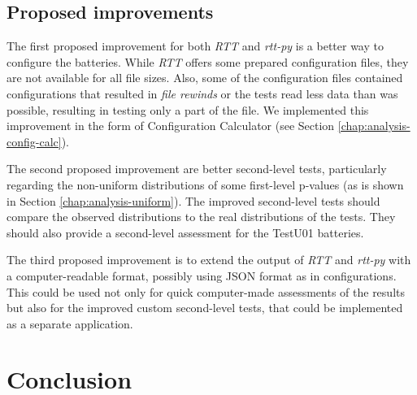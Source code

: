 \documentclass[
  digital,     %
  oneside,     %
  nosansbold,  %
  nocolorbold, %
  nolof,         %
  nolot,         %
]{fithesis4}
\begin{document}
\section{Proposed improvements}
The first proposed improvement for both \emph{RTT} and \emph{rtt-py} is a better way to configure the batteries. While \emph{RTT} offers some prepared configuration files, they are not available for all file sizes. Also, some of the configuration files contained configurations that resulted in \emph{file rewinds} or the tests read less data than was possible, resulting in testing only a part of the file. We implemented this improvement in the form of Configuration Calculator (see Section \ref{chap:analysis-config-calc}).

The second proposed improvement are better second-level tests, particularly regarding the non-uniform distributions of some first-level p-values (as is shown in Section \ref{chap:analysis-uniform}). The improved second-level tests should compare the observed distributions to the real distributions of the tests. They should also provide a second-level assessment for the TestU01 batteries.

The third proposed improvement is to extend the output of \emph{RTT} and \emph{rtt-py} with a computer-readable format, possibly using JSON format as in configurations. This could be used not only for quick computer-made assessments of the results but also for the improved custom second-level tests, that could be implemented as a separate application.


\chapter{Conclusion}


\end{document}
